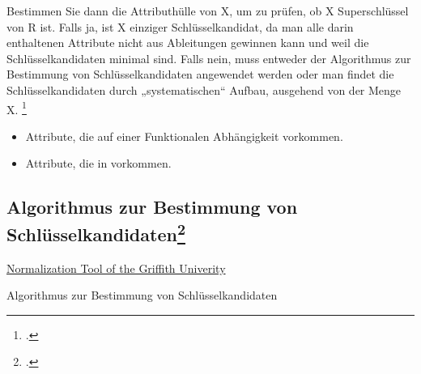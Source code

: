 \documentclass{lehramt-informatik-haupt}
\begin{document}
Bestimmen Sie dann die Attributhülle von X, um zu prüfen, ob X
Superschlüssel von R ist. Falls ja, ist X einziger Schlüsselkandidat, da
man alle darin enthaltenen Attribute nicht aus Ableitungen gewinnen kann
und weil die Schlüsselkandidaten minimal sind. Falls nein, muss entweder
der Algorithmus zur Bestimmung von Schlüsselkandidaten angewendet werden
oder man findet die Schlüsselkandidaten durch „systematischen“ Aufbau,
ausgehend von der Menge X.
\footcite[Seite 11]{db:fs:4}

\begin{itemize}
\item Attribute, die auf  einer
Funktionalen Abhängigkeit vorkommen.

\item Attribute, die in 
vorkommen.
\end{itemize}

%

\subsection{Algorithmus zur Bestimmung von Schlüsselkandidaten\footcite[Seite 8]{db:fs:4}}

\href{http://www.ict.griffith.edu.au/normalization_tools/normalization/ind.php}
{Normalization Tool of the Griffith Univerity}

\begin{algorithm}


\caption{Algorithmus zur Bestimmung von Schlüsselkandidaten}
\end{algorithm}

\literatur
\end{document}
